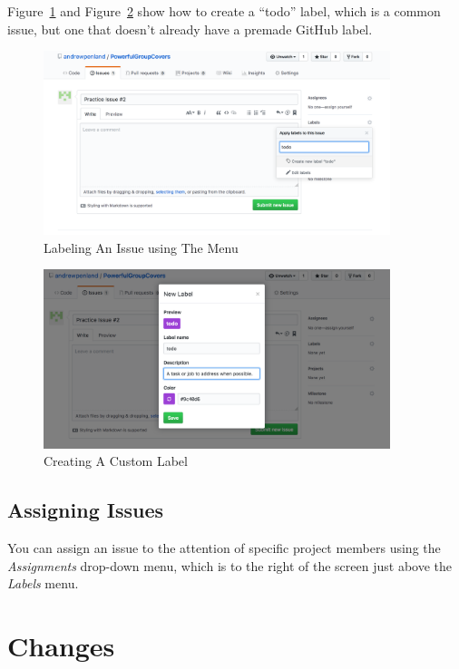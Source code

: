 \documentclass[11pt]{article}
\begin{document}
Figure~\ref{fig:begin-typing-todo} and Figure~\ref{fig:todo-label-details} show how to create a ``todo'' label, which is a common issue, but one that doesn't already have a premade GitHub label. 


\begin{figure}\label{fig:begin-typing-todo}
\includegraphics[width=0.9\textwidth]{CreatingLabels}
\caption{Labeling An Issue using The Menu}
\end{figure}

\begin{figure}\label{fig:todo-label-details}
\includegraphics[width=0.9\textwidth]{NewLabelBox}
\caption{Creating A Custom Label}
\end{figure}


\subsection{Assigning Issues}

You can assign an issue to the attention of specific project members using the \textit{Assignments} drop-down menu, which is to the right of the screen just above the \textit{Labels} menu. 

\section{Changes}
\end{document}
